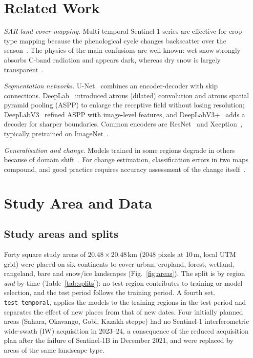 \documentclass[12pt,conference]{IEEEtran}
\begin{document}
\section{Related Work}

\textit{SAR land-cover mapping.} Multi-temporal Sentinel-1 series are
effective for crop-type mapping because the phenological cycle changes backscatter over the
season~\cite{ndikumana2018deep}. The physics of the main confusions are well known: wet snow strongly absorbs C-band
radiation and appears dark, whereas dry snow is largely transparent~\cite{nagler2000retrieval}.

\textit{Segmentation networks.} U-Net~\cite{ronneberger2015unet} combines an encoder-decoder with skip connections.
DeepLab~\cite{chen2018deeplab} introduced atrous (dilated) convolution and atrous spatial pyramid pooling (ASPP) to
enlarge the receptive field without losing resolution; DeepLabV3~\cite{chen2017rethinking} refined ASPP with
image-level features, and DeepLabV3+~\cite{chen2018encoder} adds a decoder for sharper boundaries. Common encoders are ResNet~\cite{he2016deep} and Xception~\cite{chollet2017xception}, typically pretrained on
ImageNet~\cite{deng2009imagenet}.

\textit{Generalisation and change.} Models trained in some regions degrade in others because of domain
shift~\cite{tuia2016domain}. For change estimation, classification errors in two maps compound, and good practice
requires accuracy assessment of the change itself~\cite{olofsson2014good}.

\section{Study Area and Data}

\subsection{Study areas and splits}

Forty square study areas of $20.48\times20.48$\,km (2048 pixels at 10\,m, local UTM grid) were placed on six
continents to cover urban, cropland, forest, wetland, rangeland, bare and snow/ice landscapes (Fig.~\ref{fig:areas}).
The split is by region \emph{and} by time (Table~\ref{tab:splits}): no test region contributes to training or model
selection, and the test period follows the training period. A fourth set, \texttt{test\_temporal}, applies the models
to the training regions in the test period and separates the effect of new places from that of new dates. Four
initially planned areas (Sahara, Okavango, Gobi, Kazakh steppe) had no Sentinel-1 interferometric wide-swath (IW)
acquisition in 2023--24, a consequence of the reduced acquisition plan after the failure of Sentinel-1B in December
2021, and were replaced by areas of the same landscape type.
\end{document}
